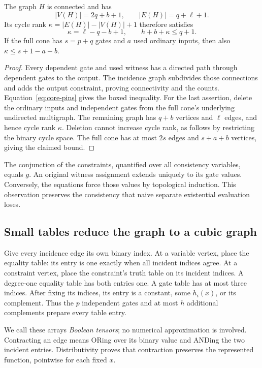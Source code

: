 \begin{lemma}\label{lem:consistency-budget}
The graph $H$ is connected and has
\[
 |V(H)|=2q+b+1,\qquad |E(H)|=q+\ell+1.
\]
Its cycle rank $\kappa=|E(H)|-|V(H)|+1$ therefore satisfies
\begin{equation}\label{eq:consistency-budget}
 \boxed{\quad \kappa=\ell-q-b+1,\qquad h+b+\kappa\le q+1.\quad}
\end{equation}
If the full cone has $s=p+q$ gates and $a$ used ordinary inputs, then
also $\kappa\le s+1-a-b$.
\end{lemma}
\begin{proof}
Every dependent gate and used witness has a directed path through
dependent gates to the output. The incidence graph subdivides those
connections and adds the output constraint, proving connectivity and
the counts. Equation~\eqref{eq:core-pins} gives the boxed inequality.
For the last assertion, delete the ordinary inputs and independent
gates from the full cone's underlying undirected multigraph. The
remaining graph has $q+b$ vertices and $\ell$ edges, and hence cycle
rank $\kappa$. Deletion cannot increase cycle rank, as follows by
restricting the binary cycle space. The full cone has at most $2s$
edges and $s+a+b$ vertices, giving the claimed bound.
\end{proof}

The conjunction of the constraints, quantified over all consistency
variables, equals $g$. An original witness assignment extends uniquely
to its gate values. Conversely, the equations force those values by
topological induction. This observation preserves the consistency that
naive separate existential evaluation loses.

\subsection{Small tables reduce the graph to a cubic graph}

Give every incidence edge its own binary index. At a variable vertex,
place the equality table: its entry is one exactly when all incident
indices agree. At a constraint vertex, place the constraint's truth
table on its incident indices. A degree-one equality table has both
entries one. A gate table has at most three indices. After fixing its
indices, its entry is a constant, some $h_i(x)$, or its complement.
Thus the $p$ independent gates and at most $h$ additional complements
prepare every table entry.

We call these arrays \emph{Boolean tensors}; no numerical approximation
is involved. Contracting an edge means ORing over its binary value and
ANDing the two incident entries. Distributivity proves that contraction
preserves the represented function, pointwise for each fixed $x$.

